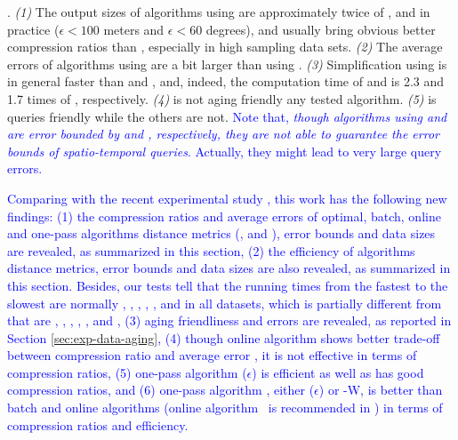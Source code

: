 {.
\emph{(1)} The output sizes of algorithms using \sed are approximately twice of \ped, and in practice (\eg $\epsilon <100$ meters and $\epsilon < 60$ degrees), \ped and \sed usually bring obvious better compression ratios than \dad, especially in high sampling data sets.
%
\emph{(2)} The average errors of algorithms using \sed are a bit larger than using \ped.
%
\emph{(3)} Simplification using \dad is in general faster than \ped and \sed, and, indeed, the computation time of \ped and \sed is 2.3 and 1.7 times of \dad, respectively.
%
{\emph{(4)} \dad is not aging friendly \wrt any tested algorithm.}
%
{\emph{(5)} \sed is queries friendly   while the others are not. }
\textcolor{blue}{Note that, \emph{though algorithms using \ped and \dad are error bounded by \ped and \dad, respectively, they are not able to guarantee the error bounds of spatio-temporal queries}. Actually, they might lead to very large query errors.}



\textcolor{blue}{Comparing with the recent experimental study \cite{Zhang:Evaluation}, this work has the following new findings:
	(1) the compression ratios and average errors of optimal, batch, online and one-pass algorithms \wrt distance metrics (\ped, \sed and \dad), error bounds and data sizes are revealed, as summarized in this section,
	(2) the efficiency of algorithms \wrt distance metrics, error bounds and data sizes are also revealed, as summarized in this section. Besides, our tests tell that the running times from the fastest to the slowest are normally \intersec, \interval, \operb, \squishe, \dpa, \dagots and \bqsa in all datasets, which is partially different from \cite{Zhang:Evaluation} that are \intersec, \interval, \dpa, \operb, \dagots, \squishe and \bqsa,
	(3) aging friendliness and errors are revealed, as reported in Section \ref{sec:exp-data-aging},
	(4) though online algorithm \dagots shows better trade-off between compression ratio and average error \cite{Zhang:Evaluation}, it is not effective in terms of compression ratios,
	(5) one-pass algorithm \siped ($\epsilon$) is efficient as well as has good compression ratios, and
	(6) one-pass algorithm \cised, either \cised($\epsilon$) or \cised-W, is better than batch and online algorithms (online algorithm \dagots~is recommended in \cite{Zhang:Evaluation}) in terms of compression ratios and efficiency.}


}
